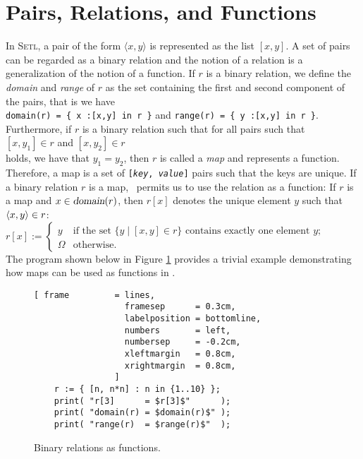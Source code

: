 \section{Pairs, Relations,  and Functions}
In \textsc{Setl}, a pair of the form $\langle x, y \rangle$ is represented as the list $[x,y]$.
A set of pairs can be regarded as a binary relation and the notion of a relation is a
generalization of the notion of a function.   If $r$ is a binary relation, we define the
\emph{domain} and \emph{range} of $r$ as the set containing the first and second component
of the pairs, that is we have
\\[0.2cm]
\hspace*{1.3cm}
\texttt{domain(r) = \{ x :[x,y] in r \}} \quad and \quad
\texttt{range(r)  = \{ y :[x,y] in r \}}.
\\[0.2cm]
Furthermore, if $r$ is a binary relation
such that for all pairs such that
\\[0.2cm]
\hspace*{1.3cm}
$[x,y_1] \in r$ \quad and \quad $[x,y_2] \in r$ 
\\[0.2cm]
holds, we have that $y_1 = y_2$, then $r$ is called a \emph{map} and represents a function.
Therefore, a map is a set of \texttt{[\textsl{key}, \textsl{value}]} pairs such that the
keys are unique. 
If a binary relation $r$ is a map, \setlx\ permits us to use the relation as a function:  If $r$ is a map
and $x \in \textsl{domain}(r)$, then $r[x]$ denotes the unique element $y$ such that 
$\pair(x,y) \in r$:
\\[0.2cm]
\hspace*{1.3cm}
$r[x] := \left\{
\begin{array}{ll}
  y & \mbox{if the set $\{ y \mid [x,y] \in r\}$ contains exactly one element $y$;} \\[0.2cm]
  \Omega & \mbox{otherwise}.
\end{array} \right.
$
\\[0.2cm]
The program shown below in Figure
\ref{fig:map.stlx} provides a trivial example demonstrating how maps can be used
as functions in  \setlx.  
 

\begin{figure}[!ht]
  \centering
\begin{Verbatim}[ frame         = lines, 
                  framesep      = 0.3cm, 
                  labelposition = bottomline,
                  numbers       = left,
                  numbersep     = -0.2cm,
                  xleftmargin   = 0.8cm,
                  xrightmargin  = 0.8cm,
                ]
    r := { [n, n*n] : n in {1..10} };
    print( "r[3]      = $r[3]$"      );
    print( "domain(r) = $domain(r)$" );
    print( "range(r)  = $range(r)$"  );
\end{Verbatim} 
\vspace*{-0.3cm}
\caption{Binary relations as functions.}  \label{fig:map.stlx}
\end{figure} %

